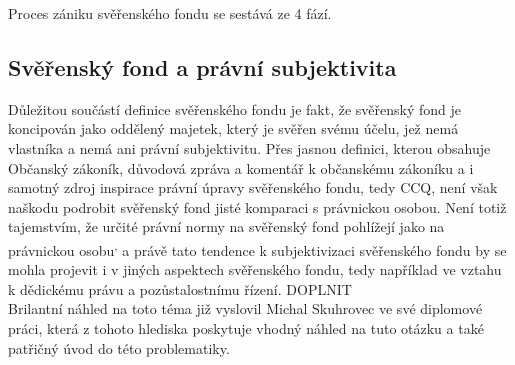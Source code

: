 \documentclass{article}
\begin{document}


Proces zániku svěřenského fondu se sestává ze 4 fází.

\subsection{Svěřenský fond a právní subjektivita}





Důležitou součástí definice svěřenského fondu je fakt, že svěřenský fond je koncipován jako oddělený majetek, který je svěřen svému účelu, jež nemá vlastníka a nemá ani právní subjektivitu. Přes jasnou definici, kterou obsahuje Občanský zákoník, důvodová zpráva a komentář k občanskému zákoníku a i samotný zdroj inspirace právní úpravy svěřenského fondu, tedy CCQ, není však naškodu podrobit svěřenský fond jisté komparaci s právnickou osobou. Není totiž tajemstvím, že určité právní normy na svěřenský fond pohlížejí jako na právnickou osobu\textsuperscript{,} a právě tato tendence k subjektivizaci svěřenského fondu by se mohla projevit i v jiných aspektech svěřenského fondu, tedy například ve vztahu k dědickému právu a pozůstalostnímu řízení. DOPLNIT\\

Brilantní náhled na toto téma již vyslovil Michal Skuhrovec ve své diplomové práci, která z tohoto hlediska poskytuje vhodný náhled na tuto otázku a také patřičný úvod do této problematiky.\\

\end{document}
